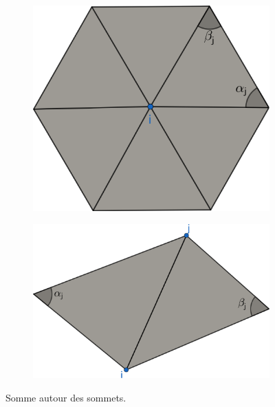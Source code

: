 \begin{figure}[!h]
\begin{subfigure}{0.46\textwidth}
    \includegraphics[width=\textwidth]{images/laplace_cotan_3.pdf}
\end{subfigure}
\hfill
\begin{subfigure}{0.46\textwidth}
    \includegraphics[width=\textwidth]{images/laplace_cotan_2.pdf}
\end{subfigure}
\caption{Somme autour des sommets.}
\label{fig:laplace_cotan_cotan}
\end{figure}

